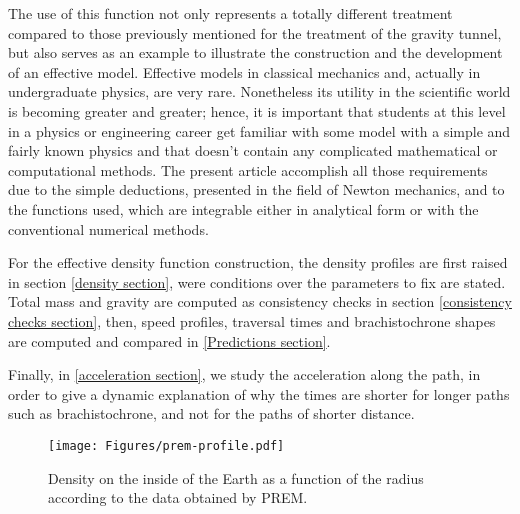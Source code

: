 \documentclass[aps,twocolumn,showpacs,preprintnumbers]{revtex4}
\begin{document}
    \begin{comment}
    Two profiles are used, given by decreasing power law functions, using two and three parameters, among them, the power itself, to get from it the most physics possible. What we meant is that our effective density function accounts for the gravitational acceleration on the surface, $g=9.81 m/s^2$ and for the traversal times in a gravity tunnel, with respect to those obtained in \citep{gravity-train-prem} for the PREM description. 
    \end{comment}
    
    The use of this function not only represents a totally different treatment compared to those previously mentioned for the treatment of the gravity tunnel, but also serves as an example to illustrate the construction and the development of an effective model. Effective models in classical mechanics and, actually in undergraduate physics, are very rare. Nonetheless its utility  in the scientific world is becoming greater and greater; hence, it is important that students at this level in a physics or engineering career get familiar with some model with a simple and fairly known physics and that doesn't contain any complicated mathematical or computational methods. The present article accomplish all those requirements due to the simple deductions, presented in the field of Newton mechanics, and to the functions used, which are integrable  either in analytical form or with the conventional numerical methods.

    For the effective density function construction, the density profiles are first raised in section \ref{density section}, were conditions over the parameters to fix are stated. Total mass and gravity are computed as consistency checks in section \ref{consistency checks section}, then, speed profiles, traversal times and brachistochrone shapes are computed and compared in \ref{Predictions section}. 
    
    Finally, in \ref{acceleration section}, we study the acceleration along the path, in order to give a dynamic explanation of why the times are shorter for longer paths such as brachistochrone, and not for the paths of shorter distance.

    \begin{figure}
        \centering
        \texttt{[image: Figures/prem-profile.pdf]}
        \caption{Density on the inside of the Earth as a function of the radius according to the data obtained by PREM.}
        \label{fig:Prem density}
    \end{figure}
\end{document}
